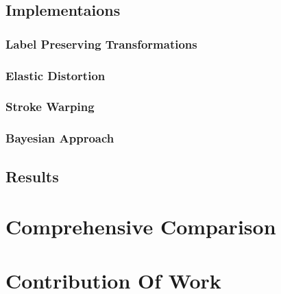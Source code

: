 \section{Implementaions}

\subsection{Label Preserving Transformations}
\subsection{Elastic Distortion}
\subsection{Stroke Warping}
\subsection{Bayesian Approach}

\section{Results}
\label{tit:results}


\chapter{Comprehensive Comparison}

\chapter{Contribution Of Work}